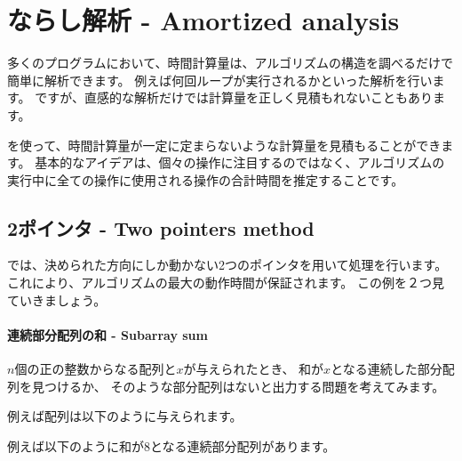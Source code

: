 \chapter{ならし解析 - Amortized analysis}


多くのプログラムにおいて、時間計算量は、アルゴリズムの構造を調べるだけで簡単に解析できます。
例えば何回ループが実行されるかといった解析を行います。
ですが、直感的な解析だけでは計算量を正しく見積もれないこともあります。

 を使って、時間計算量が一定に定まらないような計算量を見積もることができます。
基本的なアイデアは、個々の操作に注目するのではなく、アルゴリズムの実行中に全ての操作に使用される操作の合計時間を推定することです。

\section{2ポインタ - Two pointers method}


では、決められた方向にしか動かない2つのポインタを用いて処理を行います。
これにより、アルゴリズムの最大の動作時間が保証されます。
この例を２つ見ていきましょう。

\subsubsection{連続部分配列の和 - Subarray sum}

$n$個の正の整数からなる配列と$x$が与えられたとき、
和が$x$となる連続した部分配列を見つけるか、
そのような部分配列はないと出力する問題を考えてみます。

例えば配列は以下のように与えられます。
\begin{center}
\end{center}
例えば以下のように和が$8$となる連続部分配列があります。
\begin{center}
\end{center}

